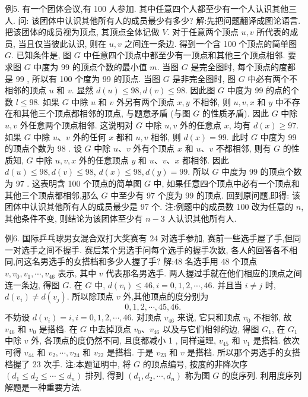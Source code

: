 例5. 有一个团体会议,有 100 人参加.
其中任意四个人都至少有一个人认识其他三人.
问: 该团体中认识其他所有人的成员最少有多少?
解:先把问题翻译成图论语言.
把该团体的成员视为顶点, 其顶点全体记做 $V$. 对于任意两个顶点 $u, v$ 所代表的成员, 当且仅当彼此认识, 则在 $u, v$
之间连一条边.
得到一个含 100 个顶点的简单图 $G$. 已知条件是, 图 $G$ 中任意四个顶点中都至少有一顶点和其他三个顶点相邻.
要求图 $G$ 中度为 99 的顶点个数的最小值 $m$.
当图 $G$ 是完全图时, 每个顶点的度都是 99 , 所以有 100 个度为 99 的顶点.
当图 $G$ 是非完全图时, 图 $G$ 中必有两个不相邻的顶点 $u$ 和 $v$. 显然 $d(u) \leqslant 98, d(v) \leqslant 98$. 因此图 $G$ 中度为 99 的点的个数 $l \leqslant 98$.
如果 $G$ 中除 $u$ 和 $v$ 外另有两个顶点 $x, y$ 不相邻, 则 $u, v, x$ 和 $y$ 中不存在和其他三个顶点都相邻的顶点, 与题意矛盾 (与图 $G$ 的性质矛盾). 因此 $G$ 中除 $u, v$ 外任意两个顶点相邻.
这说明对 $G$ 中除 $u, v$ 外的任意点 $x$, 均有 $d(x) \geqslant 97$.
如果 $G$ 中除 $u 、 v$ 外的任何 $x$ 都和 $u, v$ 相邻, 则 $d(x)=99$. 此时 $G$ 中度为 99 的顶点个数为 98 .
设 $G$ 中除 $u 、 v$ 外有个顶点 $x$ 和 $u 、 v$ 不都相邻, 则有 $G$ 的性质知, $G$ 中除 $u, v, x$ 外的任意顶点 $y$ 和 $u 、 v 、 x$ 都相邻.
因此 $d(u) \leqslant 98, d(v) \leqslant 98$, $d(x) \leqslant 98, d(y)=99$. 所以 $G$ 中度为 99 的顶点个数为 97 .
这表明含 100 个顶点的简单图 $G$ 中, 如果任意四个顶点中必有一个顶点和其他三个顶点都相邻,那么 $G$ 中至少有 97 个度为 99 的顶点.
回到原问题,即得: 该团体中认识其他所有人的成员最少是 97 个.
注:例题中的成员数 100 改为任意的 $n$, 其他条件不变, 则结论为该团体至少有 $n-3$ 人认识其他所有人.



例6. 国际乒乓球男女混合双打大奖赛有 24 对选手参加, 赛前一些选手屋了手,但同一对选手之间不握手.
赛后某个男选手问每个选手的握手次数, 各人的回答各不相同,问这名男选手的女搭档和多少人握了手?
解:48 名选手用 48 个顶点 $v, v_0, v_1, \cdots, v_{46}$ 表示, 其中 $v$ 代表那名男选手.
两人握过手就在他们相应的顶点之间连一条边, 得图 $G$. 在 $G$ 中, $d\left(v_i\right) \leqslant 46, i=0,1,2, \cdots, 46$. 并且当 $i \neq j$ 时, $d\left(v_i\right) \neq d\left(v_j\right)$. 所以除顶点 $v$ 外,其他顶点的度分别为
$$
0,1,2, \cdots, 45,46 \text {. }
$$
不妨设 $d\left(v_i\right)=i, i=0,1,2, \cdots, 46$. 对顶点 $v_{46}$ 来说, 它只和顶点 $v_0$ 不相邻, 故 $v_{46}$ 和 $v_0$ 是搭档.
在 $G$ 中去掉顶点 $v_0 、 v_{46}$ 以及与它们相邻的边, 得图 $G_1$, 在 $G_1$ 中除 $v$ 外, 各顶点的度仍然不同, 且度都减小 1 , 同样道理, $v_{45}$ 和 $v_1$ 是搭档.
依次可得 $v_{44}$ 和 $v_2, \cdots, v_{24}$ 和 $v_{22}$ 是搭档.
于是 $v_{23}$ 和 $v$ 是搭档.
所以那个男选手的女搭档握了 23 次手.
注:本题证明中, 将 $G$ 的顶点编号, 按度的非降次序 $\left(d_1 \leqslant d_2 \leqslant \cdots \leqslant\right. \left.d_n\right)$ 排列, 得到 $\left(d_1, d_2, \cdots, d_n\right)$ 称为图 $G$ 的度序列.
利用度序列解题是一种重要方法.



